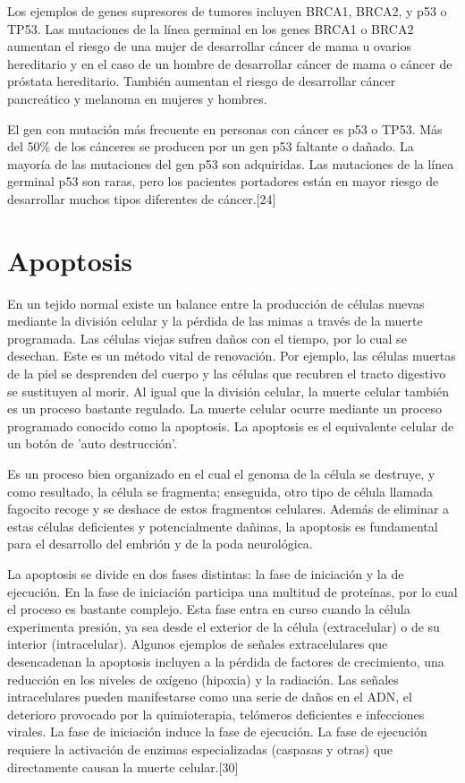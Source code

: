 \hspace{.1cm}Los ejemplos de genes supresores de tumores incluyen BRCA1, BRCA2, y p53 o TP53. Las mutaciones de la línea germinal en los genes BRCA1 o BRCA2 aumentan el riesgo de una mujer de desarrollar cáncer de mama u ovarios hereditario y en el caso de un hombre de desarrollar cáncer de mama o cáncer de próstata hereditario. También aumentan el riesgo de desarrollar cáncer pancreático y melanoma en mujeres y hombres.

\hspace{.1cm}El gen con mutación más frecuente en personas con cáncer es p53 o TP53. Más del 50\% de los cánceres se producen por un gen p53 faltante o dañado. La mayoría de las mutaciones del gen p53 son adquiridas. Las mutaciones de la línea germinal p53 son raras, pero los pacientes portadores están en mayor riesgo de desarrollar muchos tipos diferentes de cáncer.[24]

\section{Apoptosis}
\hspace{.1cm}En un tejido normal existe un balance entre la producción de células nuevas mediante la división celular y la pérdida de las mimas a través de la muerte programada. Las células viejas sufren daños con el tiempo, por lo cual se desechan. Este es un método vital de renovación. Por ejemplo, las células muertas de la piel se desprenden del cuerpo y las células que recubren el tracto digestivo se sustituyen al morir. Al igual que la división celular, la muerte celular también es un proceso bastante regulado. La muerte celular ocurre mediante un proceso programado conocido como la apoptosis. La apoptosis es el equivalente celular de un botón de 'auto destrucción'.

\hspace{.1cm}Es un proceso bien organizado en el cual el genoma de la célula se destruye, y como resultado, la célula se fragmenta; enseguida, otro tipo de célula llamada fagocito recoge y se deshace de estos fragmentos celulares. Además de eliminar a estas células deficientes y potencialmente dañinas, la apoptosis es fundamental para el desarrollo del embrión y de la poda neurológica.

\hspace{.1cm}La apoptosis se divide en dos fases distintas: la fase de iniciación y la de ejecución. En la fase de iniciación participa una multitud de proteínas, por lo cual el proceso es bastante complejo. Esta fase entra en curso cuando la célula experimenta presión, ya sea desde el exterior de la célula (extracelular) o de su interior (intracelular). Algunos ejemplos de señales extracelulares que desencadenan la apoptosis incluyen a la pérdida de factores de crecimiento, una reducción en los niveles de oxígeno (hipoxia) y la radiación. Las señales intracelulares pueden manifestarse como una serie de daños en el ADN, el deterioro provocado por la quimioterapia, telómeros deficientes e infecciones virales. La fase de iniciación induce la fase de ejecución. La fase de ejecución requiere la activación de enzimas especializadas (caspasas y otras) que directamente causan la muerte celular.[30]

